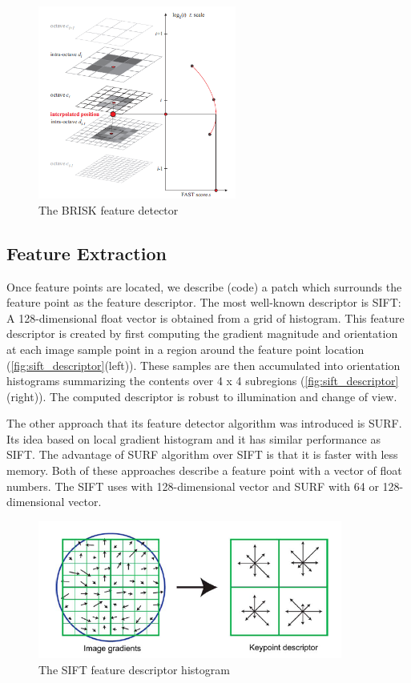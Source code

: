 \begin{figure}[H]
  \centering
  \includegraphics[width=65mm]{figures/brisk_detector}
  \caption{The BRISK feature detector}\label{fig:brisk_detector}
\end{figure}

\subsection{Feature Extraction} \label{subsec:feature_extraction}
Once feature points are located, we describe (code) a patch which surrounds the feature point as the feature descriptor. The most well-known descriptor is SIFT: A 128-dimensional float vector is obtained from a grid of histogram. This feature descriptor is created by first computing the gradient magnitude and orientation at each image sample point in a region around the feature point location (\autoref{fig:sift_descriptor}(left)). These samples are then accumulated into orientation histograms summarizing the contents over 4 x 4 subregions (\autoref{fig:sift_descriptor}(right)). The computed descriptor is robust to illumination and change of view. 

The other approach that its feature detector algorithm was introduced is SURF. Its idea based on local gradient histogram and it has similar performance as SIFT. The advantage of SURF algorithm over SIFT is that it is faster with less memory. Both of these approaches describe a feature point with a vector of float numbers. The SIFT uses with 128-dimensional vector and SURF with 64 or 128-dimensional vector.

\begin{figure}[H]
  \centering
  \includegraphics[width=100mm]{figures/sift_descriptor}
  \caption{The SIFT feature descriptor histogram}\label{fig:sift_descriptor}
\end{figure}

